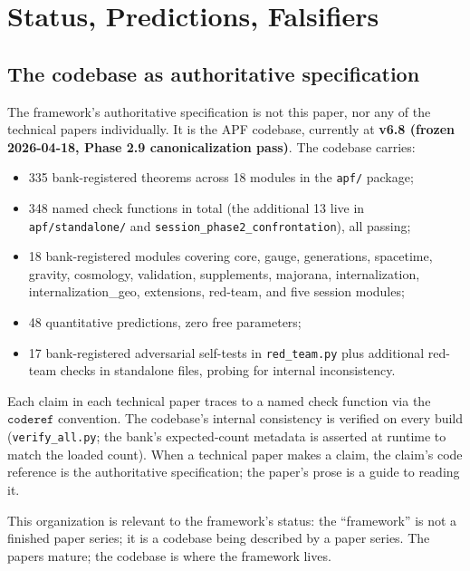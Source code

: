 \documentclass[11pt]{article}
\begin{document}
\clearpage

\section{Status, Predictions, Falsifiers}\label{sec:status}

\subsection{The codebase as authoritative specification}\label{sec:codebase}

The framework's authoritative specification is not this paper, nor any of the technical papers individually. It is the APF codebase, currently at \textbf{v6.8 (frozen 2026-04-18, Phase 2.9 canonicalization pass)}. The codebase carries:

\begin{itemize}
    \item 335 bank-registered theorems across 18 modules in the \texttt{apf/} package;
    \item 348 named check functions in total (the additional 13 live in \texttt{apf/standalone/} and \texttt{session\_phase2\_confrontation}), all passing;
    \item 18 bank-registered modules covering core, gauge, generations, spacetime, gravity, cosmology, validation, supplements, majorana, internalization, internalization\_geo, extensions, red-team, and five session modules;
    \item 48 quantitative predictions, zero free parameters;
    \item 17 bank-registered adversarial self-tests in \texttt{red\_team.py} plus additional red-team checks in standalone files, probing for internal inconsistency.
\end{itemize}

\noindent Each claim in each technical paper traces to a named check function via the $\texttt{coderef}$ convention. The codebase's internal consistency is verified on every build (\texttt{verify\_all.py}; the bank's expected-count metadata is asserted at runtime to match the loaded count). When a technical paper makes a claim, the claim's code reference is the authoritative specification; the paper's prose is a guide to reading it.

This organization is relevant to the framework's status: the ``framework'' is not a finished paper series; it is a codebase being described by a paper series. The papers mature; the codebase is where the framework lives.
\end{document}
